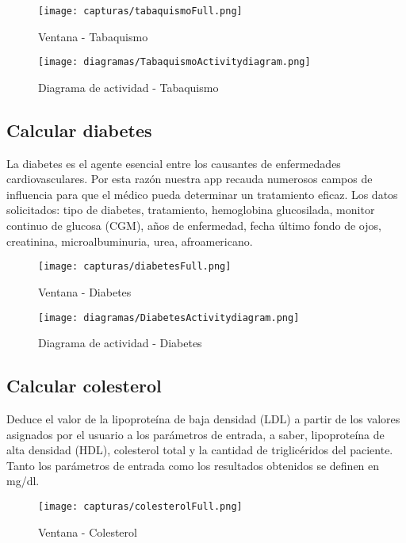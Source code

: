 \documentclass[11pt,spanish,
		listoftables,listoffigures]
		{tfgplantilla}
\begin{document}
\begin{figure}[H]
\centering
\texttt{[image: capturas/tabaquismoFull.png]}
\caption{Ventana - Tabaquismo}
\end{figure}

\begin{figure}[H]
\centering
\texttt{[image: diagramas/TabaquismoActivitydiagram.png]}
\caption{Diagrama de actividad - Tabaquismo}
\end{figure}

\subsection {Calcular diabetes}

La diabetes es el agente esencial entre los causantes de enfermedades cardiovasculares. Por esta razón nuestra app recauda numerosos campos de influencia para que el médico pueda determinar un tratamiento eficaz. Los datos solicitados: tipo de diabetes, tratamiento, hemoglobina glucosilada, monitor continuo de glucosa (CGM), años de enfermedad, fecha último fondo de ojos, creatinina, microalbuminuria, urea, afroamericano.

\begin{figure}[H]
\centering
\texttt{[image: capturas/diabetesFull.png]}
\caption{Ventana - Diabetes}
\end{figure}

\begin{figure}[H]
\centering
\texttt{[image: diagramas/DiabetesActivitydiagram.png]}
\caption{Diagrama de actividad - Diabetes}
\end{figure}

\subsection {Calcular colesterol}

Deduce el valor de la lipoproteína de baja densidad (LDL) a partir de los valores asignados por el usuario a los parámetros de entrada, a saber, lipoproteína de alta densidad (HDL), colesterol total y la cantidad de triglicéridos del paciente.
Tanto los parámetros de entrada como los resultados obtenidos se definen en mg/dl. 

\begin{figure}[H]
\centering
\texttt{[image: capturas/colesterolFull.png]}
\caption{Ventana - Colesterol}
\end{figure}
\end{document}
